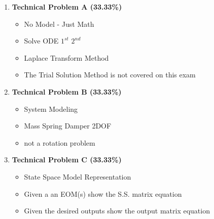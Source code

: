 \documentclass[11pt]{article}
\begin{document}
\begin{itemize}
\begin{enumerate}
		\item  \textbf{\Large Technical Problem A (33.33\%)}\\
		\begin{itemize}
			\item No Model - Just Math
			\item Solve ODE $1^{st}$\hspace{3mm} $2^{nd}$
			\item Laplace Transform Method\\
			\item The Trial Solution Method is not covered on this exam\\
		\end{itemize}
		\item  \textbf{\Large Technical Problem B (33.33\%)}\\
		\begin{itemize}
			\item System Modeling
			\item Mass Spring Damper 2DOF \\
			\item not a rotation problem \\

		\end{itemize}
		\item  \textbf{\Large Technical Problem C (33.33\%)}\\
		\begin{itemize}
			\item State Space Model Representation	 \\
			\item Given a an EOM(s) show the S.S. matrix equation \\
			\item Given the desired outputs show the output matrix equation \\


		\end{itemize}
	\end{enumerate}
%

\end{itemize}


	
\end{document}
